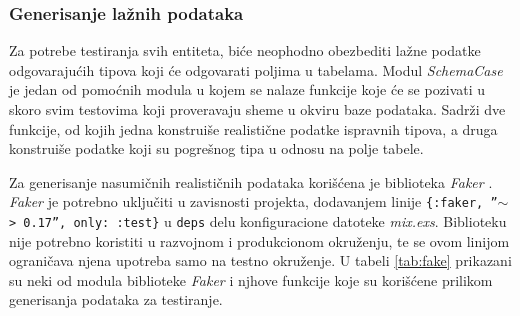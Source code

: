 \documentclass[12pt,oneside]{memoir}
\begin{document}
\subsubsection{Generisanje lažnih podataka}
\par Za potrebe testiranja svih entiteta, biće neophodno obezbediti lažne podatke odgovarajućih tipova koji će odgovarati poljima u tabelama. Modul \emph{SchemaCase} je jedan od pomoćnih modula u kojem se nalaze funkcije koje će se pozivati u skoro svim testovima koji proveravaju sheme u okviru baze podataka. Sadrži dve funkcije, od kojih jedna konstruiše realistične podatke ispravnih tipova, a druga konstruiše podatke koji su pogrešnog tipa u odnosu na polje tabele. 
\par Za generisanje nasumičnih realističnih podataka korišćena je biblioteka \emph{Faker} \cite{faker}. \emph{Faker} je potrebno uključiti u zavisnosti projekta, dodavanjem linije \texttt{\{:faker, ''$\sim$> 0.17'', only: :test\}} u \texttt{deps} delu konfiguracione datoteke \emph{mix.exs}. Biblioteku nije potrebno koristiti u razvojnom i produkcionom okruženju, te se ovom linijom ograničava njena upotreba samo na testno okruženje. U tabeli \ref{tab:fake} prikazani su neki od modula biblioteke \emph{Faker} i njhove funkcije koje su korišćene prilikom generisanja podataka za testiranje.
\end{document}
